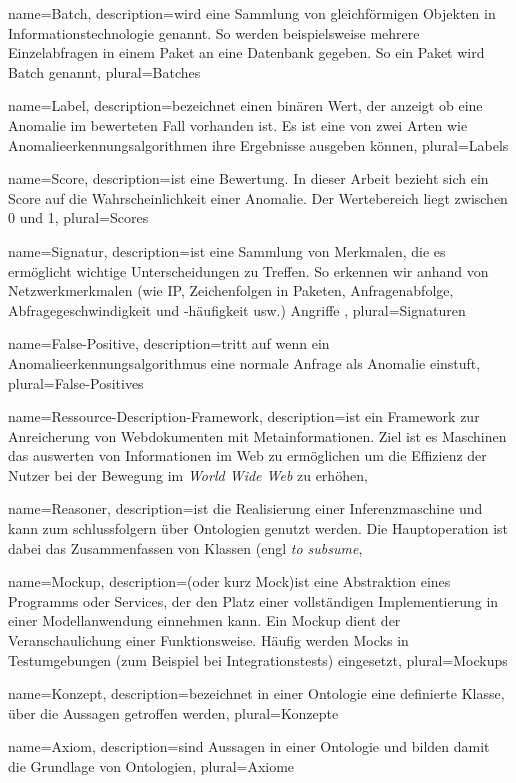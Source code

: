 {
  name={Batch},
  description={wird eine Sammlung von gleichförmigen Objekten in Informationstechnologie genannt. So werden beispielsweise mehrere Einzelabfragen in einem Paket an eine Datenbank gegeben. So ein Paket wird Batch genannt},
  plural={Batches}
}

{
  name={Label},
  description={bezeichnet einen binären Wert, der anzeigt ob eine Anomalie im bewerteten Fall vorhanden ist. Es ist eine von zwei Arten wie Anomalieerkennungsalgorithmen ihre Ergebnisse ausgeben können\cite{ahmed2016survey}},
  plural={Labels}
}

{
  name={Score},
  description={ist eine Bewertung. In dieser Arbeit bezieht sich ein Score auf die Wahrscheinlichkeit einer Anomalie. Der Wertebereich liegt zwischen 0 und 1},
  plural={Scores}
}

{
  name={Signatur},
  description={ist eine Sammlung von Merkmalen, die es ermöglicht wichtige Unterscheidungen zu Treffen. So erkennen wir anhand von Netzwerkmerkmalen (wie IP, Zeichenfolgen in Paketen, Anfragenabfolge, Abfragegeschwindigkeit und -häufigkeit usw.) Angriffe \cite{singh2012detecting}},
  plural={Signaturen}
}

{
  name={False-Positive},
  description={tritt auf wenn ein Anomalieerkennungsalgorithmus eine normale Anfrage als Anomalie einstuft},
  plural={False-Positives}
}

{
  name={Ressource-Description-Framework},
  description={ist ein Framework zur Anreicherung von Webdokumenten mit Metainformationen. Ziel ist es Maschinen das auswerten von Informationen im Web zu ermöglichen um die Effizienz der Nutzer bei der Bewegung im \textit{World Wide Web} zu erhöhen},
}

{
  name={Reasoner},
  description={ist die Realisierung einer Inferenzmaschine und kann zum schlussfolgern über Ontologien genutzt werden. Die Hauptoperation ist dabei das Zusammenfassen von Klassen (engl \textit{to subsume}},
}

{
  name={Mockup},
  description={(oder kurz Mock)ist eine Abstraktion eines Programms oder Services, der den Platz einer vollständigen Implementierung in einer Modellanwendung einnehmen kann. Ein Mockup dient der Veranschaulichung einer Funktionsweise. Häufig werden Mocks in Testumgebungen (zum Beispiel bei Integrationstests) eingesetzt},
  plural={Mockups}
}

{
  name={Konzept},
  description={bezeichnet in einer Ontologie eine definierte Klasse, über die Aussagen getroffen werden},
  plural={Konzepte}
}

{
  name={Axiom},
  description={sind Aussagen in einer Ontologie und bilden damit die Grundlage von Ontologien},
  plural={Axiome}
}
